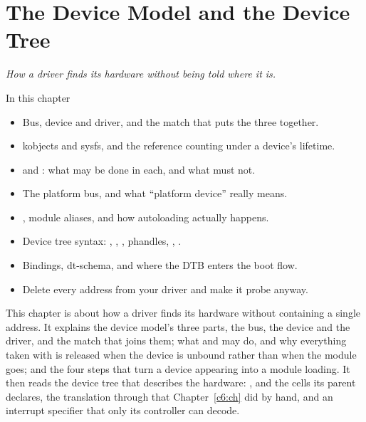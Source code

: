 
\chapter{The Device Model and the Device Tree}
\label{c10:ch}

{\large\itshape How a driver finds its hardware without being told where it is.\par}

\begin{chapterbox}{In this chapter}
\begin{itemize}
  \item Bus, device and driver, and the match that puts the three together.
  \item kobjects and sysfs, and the reference counting under a device's lifetime.
  \item {} and : what may be done in each, and what must not.
  \item The platform bus, and what ``platform device'' really means.
  \item {}, module aliases, and how autoloading actually happens.
  \item Device tree syntax: , , , phandles,
    , .
  \item Bindings, dt-schema, and where the DTB enters the boot flow.
  \item Delete every address from your driver and make it probe anyway.
\end{itemize}
\end{chapterbox}

This chapter is about how a driver finds its hardware without containing a single address. It
explains the device model's three parts, the bus, the device and the driver, and the match that
joins them; what  and  may do, and why everything taken with 
is released when the device is unbound rather than when the module goes; and the four steps that
turn a device appearing into a module loading. It then reads the device tree that describes the
hardware: ,  and the cells its parent declares, the translation through
 that Chapter~\ref{c6:ch} did by hand, and an interrupt specifier that only its
controller can decode.

